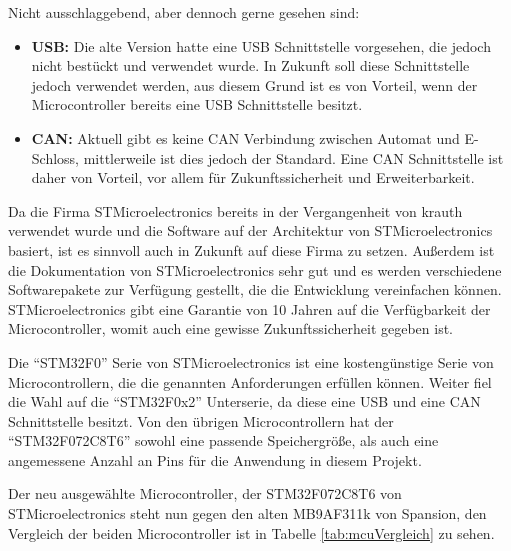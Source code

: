 Nicht ausschlaggebend, aber dennoch gerne gesehen sind:
\begin{itemize}
    \item \textbf{\ac{USB}:} Die alte Version hatte eine \ac{USB} Schnittstelle vorgesehen, die jedoch nicht
          bestückt und verwendet wurde. In Zukunft soll diese Schnittstelle jedoch verwendet werden,
          aus diesem Grund ist es von Vorteil, wenn der Microcontroller bereits eine \ac{USB}
          Schnittstelle besitzt.
    \item \textbf{\ac{CAN}:} Aktuell gibt es keine \ac{CAN} Verbindung zwischen Automat und E-Schloss, mittlerweile ist
          dies jedoch der Standard. Eine \ac{CAN} Schnittstelle ist daher von Vorteil, vor allem für
          Zukunftssicherheit und Erweiterbarkeit.
\end{itemize}

Da die Firma STMicroelectronics bereits in der Vergangenheit von krauth verwendet wurde und die Software auf der
Architektur von STMicroelectronics basiert, ist es sinnvoll auch in Zukunft auf diese Firma zu setzen.
Außerdem ist die Dokumentation von STMicroelectronics sehr gut und es werden verschiedene Softwarepakete zur
Verfügung gestellt, die die Entwicklung vereinfachen können. \\
STMicroelectronics gibt eine Garantie von 10 Jahren auf die Verfügbarkeit der Microcontroller, womit auch eine
gewisse Zukunftssicherheit gegeben ist.

Die \enquote{STM32F0} Serie von STMicroelectronics ist eine kostengünstige Serie von Microcontrollern, die
die genannten Anforderungen erfüllen können. Weiter fiel die Wahl auf die \enquote{STM32F0x2} Unterserie, da
diese eine \ac{USB} und eine \ac{CAN} Schnittstelle besitzt. Von den übrigen Microcontrollern hat der
\enquote{STM32F072C8T6} sowohl eine passende Speichergröße, als auch eine angemessene Anzahl an Pins für die
Anwendung in diesem Projekt.
\clearpage

Der neu ausgewählte Microcontroller, der STM32F072C8T6 von STMicroelectronics steht nun gegen den alten
MB9AF311k von Spansion, den Vergleich der beiden Microcontroller ist in Tabelle \ref{tab:mcuVergleich} zu sehen.

